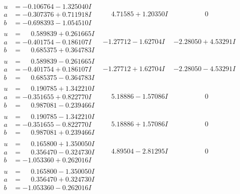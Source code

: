 \documentclass[1p]{elsarticle_modified}
\theoremstyle{definition}
\begin{document}
$$\begin{array}{c|c|c}
\begin{aligned}
u &= -0.106764 - 1.325040 I \\
a &= -0.307376 + 0.711918 I \\
b &= -0.698393 - 1.054510 I\end{aligned}
 & \phantom{-}4.71585 + 1.20350 I & \phantom{-0.000000 } 0 \\ \hline\begin{aligned}
u &= \phantom{-}0.589839 + 0.261665 I \\
a &= -0.401754 - 0.186107 I \\
b &= \phantom{-}0.685375 + 0.364783 I\end{aligned}
 & -1.27712 - 1.62704 I & -2.28050 + 4.53291 I \\ \hline\begin{aligned}
u &= \phantom{-}0.589839 - 0.261665 I \\
a &= -0.401754 + 0.186107 I \\
b &= \phantom{-}0.685375 - 0.364783 I\end{aligned}
 & -1.27712 + 1.62704 I & -2.28050 - 4.53291 I \\ \hline\begin{aligned}
u &= \phantom{-}0.190785 + 1.342210 I \\
a &= -0.351655 + 0.822770 I \\
b &= \phantom{-}0.987081 - 0.239466 I\end{aligned}
 & \phantom{-}5.18886 - 1.57086 I & \phantom{-0.000000 } 0 \\ \hline\begin{aligned}
u &= \phantom{-}0.190785 - 1.342210 I \\
a &= -0.351655 - 0.822770 I \\
b &= \phantom{-}0.987081 + 0.239466 I\end{aligned}
 & \phantom{-}5.18886 + 1.57086 I & \phantom{-0.000000 } 0 \\ \hline\begin{aligned}
u &= \phantom{-}0.165800 + 1.350050 I \\
a &= \phantom{-}0.356470 - 0.324730 I \\
b &= -1.053360 + 0.262016 I\end{aligned}
 & \phantom{-}4.89504 - 2.81295 I & \phantom{-0.000000 } 0 \\ \hline\begin{aligned}
u &= \phantom{-}0.165800 - 1.350050 I \\
a &= \phantom{-}0.356470 + 0.324730 I \\
b &= -1.053360 - 0.262016 I\end{aligned}

\end{array}$$
\end{document}
